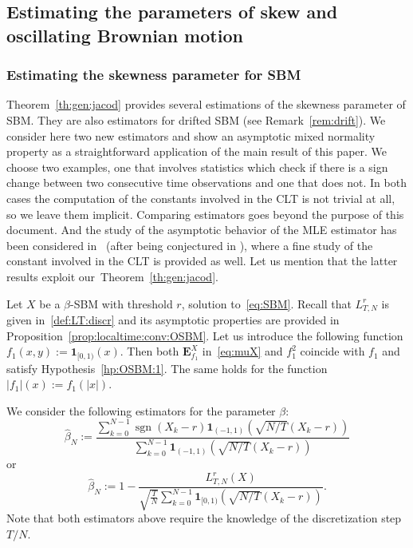 \documentclass[12pt]{article}
\numberwithin{equation}{section}
\theoremstyle{definition}
\theoremstyle{remark}
\newcommand{\ind}[1]{\mathbf{1}_{#1}}
\newcommand{\bfF}[1]{\mathbf{E}^X_{#1}}
\DeclareMathOperator{\sgn}{sgn}
\begin{document}
\subsection{Estimating the parameters of skew and oscillating Brownian motion} \label{sec:estimator_skew}


\subsubsection{Estimating the skewness parameter for SBM}
Theorem~\ref{th:gen:jacod} provides several estimations of the skewness parameter of SBM. They are also estimators for drifted SBM (see Remark~\ref{rem:drift}).
%
We consider here two new estimators and show an asymptotic mixed normality property as a straightforward application of the main result of this paper.
We choose two examples, one that involves statistics which check if there is a sign change between two consecutive time observations and one that does not. 
In both cases the computation of the constants involved in the CLT is not trivial at all, so we leave them implicit.
%
Comparing estimators goes beyond the purpose of this document.
%
And the study of the asymptotic behavior of the MLE estimator 
has been considered in~\cite{lm23} (after being conjectured in \cite{lmt1}), where a fine study of the constant involved in the CLT is provided as well. Let us mention that the latter results exploit our~Theorem~\ref{th:gen:jacod}.

Let $X$ be a $\beta$-SBM with threshold $r$, solution to~\eqref{eq:SBM}.
%
Recall that $L^r_{T,N}$ 
is given in~\eqref{def:LT:discr} and its asymptotic properties are provided in 
Proposition~\ref{prop:localtime:conv:OSBM}.
%
Let us introduce the following function $f_1(x,y):=\ind{[0,1)}(x)$. Then both $\bfF{f_1}$ in~\eqref{eq:muX} and $f_1^2$ coincide with $f_1$ and satisfy Hypothesis~\ref{hp:OSBM:1}. The same holds for the function $|f_1|(x):=f_1(|x|)$.

We consider the following estimators for the parameter $\beta$: 
\begin{equation} \label{eq:beta:estim:1}
\hat{\beta}_N 
	:= %
	\frac{ \sum_{k=0}^{N -1} \sgn(X_{k}-r) \ind{(-1,1)} (\sqrt{N/T}(X_{k}-r)) }{ \sum_{k=0}^{N -1} \ind{(-1,1)} (\sqrt{N/T}(X_{k}-r)) }
\end{equation}
or
\begin{equation} \label{eq:beta:estim:2}
\hat{\beta}_N 
	:= 
   1- \frac{L^r_{T,N}(X)}{ \sqrt{\frac{T}{N}} \sum_{k=0}^{N -1} \ind{[0,1)} (\sqrt{N/T}(X_{k}-r)) }.
\end{equation}
Note that both estimators above require the knowledge of the discretization step $T/N$. 
\end{document}
